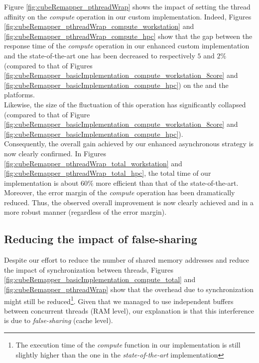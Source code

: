 		Figure \ref{fig:cubeRemapper_pthreadWrap} shows the impact of setting the thread affinity on the \emph{compute} operation in our custom implementation.   Indeed, Figures \ref{fig:cubeRemapper_pthreadWrap_compute_workstation} and \ref{fig:cubeRemapper_pthreadWrap_compute_hpc} show that the gap between the response time of the \emph{compute} operation in our enhanced custom implementation and the state-of-the-art one has been decreased to respectively $5$ and $2\%$ (compared to that of Figures \ref{fig:cubeRemapper_basicImplementation_compute_workstation_8core} and \ref{fig:cubeRemapper_basicImplementation_compute_hpc}) on the \targetPlatformHpc and the \targetPlatformLaptop platforms.\\
		Likewise, the size of the fluctuation of this operation has significantly collapsed (compared to that of Figure \ref{fig:cubeRemapper_basicImplementation_compute_workstation_8core} and \ref{fig:cubeRemapper_basicImplementation_compute_hpc}).\\
		Consequently, the overall gain achieved by our enhanced asynchronous strategy is now clearly confirmed.   In Figures \ref{fig:cubeRemapper_pthreadWrap_total_workstation} and \ref{fig:cubeRemapper_pthreadWrap_total_hpc}, the total time of our implementation is about $60\%$  more efficient than that of the state-of-the-art.   Moreover, the error margin of the \emph{compute} operation has been dramatically reduced.   Thus, the observed overall improvement is now clearly achieved and in a more robust manner (regardless of the error margin).


	\subsection{Reducing the impact of false-sharing} \label{subsection:lightenFalseSharing}
		Despite our effort to reduce the number of shared memory addresses and reduce the impact of synchronization between threads, Figures \ref{fig:cubeRemapper_basicImplementation_compute_total} and \ref{fig:cubeRemapper_pthreadWrap} show that the overhead due to synchronization might still be reduced\footnote{The execution time of the \emph{compute} function in our implementation is still slightly higher than the one in the \emph{state-of-the-art} implementation}.   Given that we managed to use independent buffers between concurrent threads (RAM level), our explanation is that this interference is due to \emph{false-sharing} (cache level).\\

